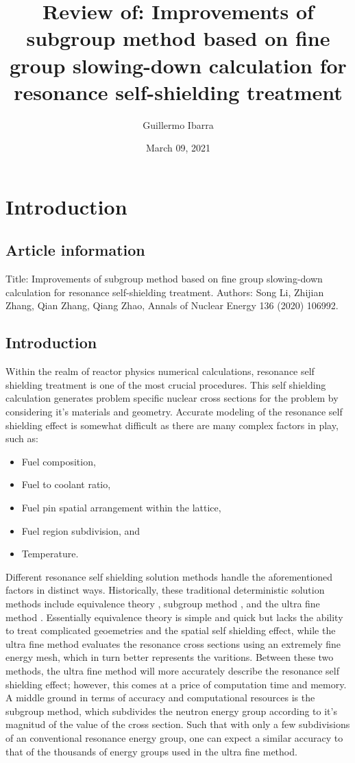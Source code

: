 \documentclass[10pt]{article}
\title{\textbf{Review of: Improvements of subgroup method based on fine group slowing-down calculation for resonance self-shielding treatment}}
\author{Guillermo Ibarra}
\date{March 09, 2021}
\begin{document}
\maketitle

\section{Introduction}

\subsection{Article information}

Title: Improvements of subgroup method based on fine group slowing-down calculation for resonance self-shielding treatment. Authors: Song Li, Zhijian Zhang, Qian Zhang, Qiang Zhao, Annals of Nuclear Energy 136 (2020) 106992.

\subsection{Introduction}

Within the realm of reactor physics numerical calculations, resonance self shielding treatment is one of the most crucial procedures. This self shielding calculation generates problem specific nuclear cross sections for the problem by considering it's materials and geometry. Accurate modeling of the resonance self shielding effect is somewhat difficult as there are many complex factors in play, such as: 
\begin{itemize}
  \item Fuel composition,
  \item Fuel to coolant ratio,
  \item Fuel pin spatial arrangement within the lattice,
  \item Fuel region subdivision, and
  \item Temperature.
\end{itemize}

Different resonance self shielding solution methods handle the aforementioned factors in distinct ways. Historically, these traditional deterministic solution methods include equivalence theory \cite{hebert1991generalization}, subgroup method \cite{hebert2009development}, and the ultra fine method \cite{sugimura2007resonance}. Essentially equivalence theory is simple and quick but lacks the ability to treat complicated geoemetries and the spatial self shielding effect, while the ultra fine method evaluates the resonance cross sections using an extremely fine energy mesh, which in turn better represents the varitions. Between these two methods, the ultra fine method will more accurately describe the resonance self shielding effect; however, this comes at a price of computation time and memory. A middle ground in terms of accuracy and computational resources is the subgroup method, which subdivides the neutron energy group according to it's magnitud of the value of the cross section. Such that with only a few subdivisions of an conventional resonance energy group, one can expect a similar accuracy to that of the thousands of energy groups used in the ultra fine method. \\
\end{document}
